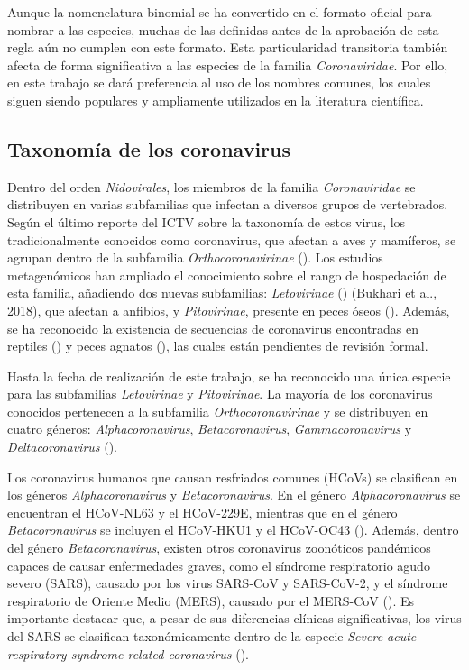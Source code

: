 Aunque la nomenclatura binomial se ha convertido en el formato oficial para 
nombrar a las especies, muchas de las definidas antes de la aprobación de 
esta regla aún no cumplen con este formato. Esta particularidad transitoria 
también afecta de forma significativa a las especies de la familia 
\textit{Coronaviridae}. Por ello, en este trabajo se dará preferencia al uso
de los nombres comunes, los cuales siguen siendo populares y ampliamente 
utilizados en la literatura científica.

\subsection{Taxonomía de los coronavirus}

Dentro del orden \textit{Nidovirales}, los miembros de la familia 
\textit{Coronaviridae} se distribuyen en varias subfamilias que infectan a 
diversos grupos de vertebrados. Según el último reporte del ICTV sobre la 
taxonomía de estos virus, los tradicionalmente conocidos como coronavirus, 
que afectan a aves y mamíferos, se agrupan dentro de la subfamilia 
\textit{Orthocoronavirinae} (\cite{woo_family_2023}). Los estudios 
metagenómicos han ampliado el conocimiento sobre el rango de hospedación de 
esta familia, añadiendo dos nuevas subfamilias: \textit{Letovirinae} 
(\cite{bukhari_description_2018}) (Bukhari et al., 2018), que afectan a 
anfibios, y \textit{Pitovirinae}, presente en peces óseos 
(\cite{mordecai_endangered_2019}). Además, se ha reconocido la existencia de
secuencias de coronavirus encontradas en reptiles 
(\cite{shi_evolutionary_2018}) y peces agnatos (\cite{miller_slippery_2021}), 
las cuales están pendientes de revisión formal.

Hasta la fecha de realización de este trabajo, se ha reconocido una única 
especie para las subfamilias \textit{Letovirinae} y \textit{Pitovirinae}. 
La mayoría de los coronavirus conocidos pertenecen a la subfamilia 
\textit{Orthocoronavirinae} y se distribuyen en cuatro géneros: 
\textit{Alphacoronavirus}, \textit{Betacoronavirus}, 
\textit{Gammacoronavirus} y \textit{Deltacoronavirus} 
(\cite{woo_family_2023}).

Los coronavirus humanos que causan resfriados comunes (HCoVs) se clasifican 
en los géneros \textit{Alphacoronavirus} y \textit{Betacoronavirus}. En el 
género \textit{Alphacoronavirus} se encuentran el HCoV-NL63 y el HCoV-229E, 
mientras que en el género \textit{Betacoronavirus} se incluyen el HCoV-HKU1 
y el HCoV-OC43 (\cite{liu_human_2021}). Además, dentro del género 
\textit{Betacoronavirus}, existen otros coronavirus zoonóticos pandémicos 
capaces de causar enfermedades graves, como el síndrome respiratorio agudo 
severo (SARS), causado por los virus SARS-CoV y SARS-CoV-2, y el síndrome 
respiratorio de Oriente Medio (MERS), causado por el MERS-CoV 
(\cite{peiris_severe_2021}). Es importante destacar que, a pesar de sus 
diferencias clínicas significativas, los virus del SARS se clasifican 
taxonómicamente dentro de la especie \textit{Severe acute respiratory 
syndrome-related coronavirus} (\cite{gorbalenya_species_2020}).

